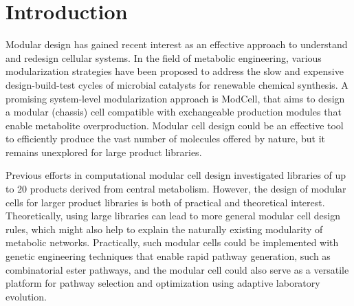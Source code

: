 \section{Introduction}
Modular design has gained recent interest as an effective approach to understand and redesign cellular systems. \citep{garcia2019b}
In the field of metabolic engineering, various modularization strategies\citep{biggs2014,trinh2015,garcia2019,garcia2019c,garcia2019d} have been proposed to address the slow and expensive design-build-test cycles of microbial catalysts for renewable chemical synthesis.\citep{nielsen2016}
A promising system-level modularization\citep{purnick2009} approach is ModCell,\citep{garcia2019} that aims to design a modular (chassis) cell compatible with exchangeable production modules that enable metabolite overproduction.
Modular cell design could be an effective tool to efficiently produce the vast number of molecules offered by nature,\citep{trinh2016, lee2019}
but it remains unexplored for large product libraries.


Previous efforts in computational modular cell design investigated libraries of up to 20 products derived from central metabolism.\citep{garcia2019,garcia2019d}
However, the design of modular cells for larger product libraries is both of practical and theoretical interest.
Theoretically, using large libraries can lead to more general modular cell design rules, which might also help to explain the naturally existing modularity of metabolic networks.\citep{garcia2019b}
Practically, such modular cells could be implemented with genetic engineering techniques that enable rapid pathway generation, such as combinatorial ester pathways,\citep{layton2014} and the modular cell could also serve as a versatile platform for pathway selection and optimization using adaptive laboratory evolution.\citep{wilbanks2017}


